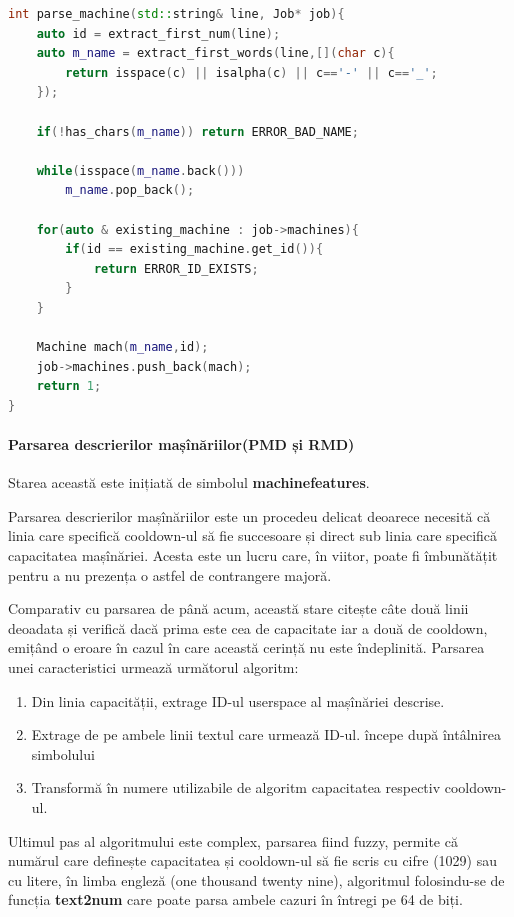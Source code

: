 \documentclass[12pt, twoside]{article}
\begin{document}
\begin{lstlisting}[language={C++},breaklines,frame={single}]
int parse_machine(std::string& line, Job* job){
    auto id = extract_first_num(line);
    auto m_name = extract_first_words(line,[](char c){
        return isspace(c) || isalpha(c) || c=='-' || c=='_';
    });

    if(!has_chars(m_name)) return ERROR_BAD_NAME;
    
    while(isspace(m_name.back()))
        m_name.pop_back();

    for(auto & existing_machine : job->machines){
        if(id == existing_machine.get_id()){
            return ERROR_ID_EXISTS;
        }
    }

    Machine mach(m_name,id);
    job->machines.push_back(mach);
    return 1;
}
\end{lstlisting}

\paragraph{Parsarea descrierilor mașînăriilor(PMD și RMD)}
Starea această este inițiată de simbolul \textbf{machinefeatures}.
\break
\break

Parsarea descrierilor mașînăriilor este un procedeu delicat
deoarece necesită că linia care specifică cooldown-ul să fie
succesoare și direct sub linia care specifică capacitatea
mașînăriei. Acesta este un lucru care, în viitor, poate fi
îmbunătățit pentru a nu prezența o astfel de contrangere
majoră. 
\break
\break

Comparativ cu parsarea de până acum, această stare citește
câte două linii deoadata și verifică dacă prima este cea de
capacitate iar a două de cooldown, emițând o eroare în cazul
în care această cerință nu este îndeplinită. Parsarea unei
caracteristici urmează următorul algoritm:
\begin{enumerate}
  \item Din linia capacității, extrage ID-ul userspace al mașînăriei descrise.
  \item Extrage de pe ambele linii textul care urmează ID-ul. începe după întâlnirea simbolului
  \item Transformă în numere utilizabile de algoritm capacitatea respectiv cooldown-ul.
\end{enumerate}
\break
\break

Ultimul pas al algoritmului este complex, parsarea fiind fuzzy,
permite că numărul care definește capacitatea și cooldown-ul
să fie scris cu cifre (1029) sau cu litere, în limba engleză
(one thousand twenty nine), algoritmul folosindu-se de funcția
\textbf{text2num} care poate parsa ambele cazuri în întregi pe
64 de biți.
\break
\break
\end{document}

